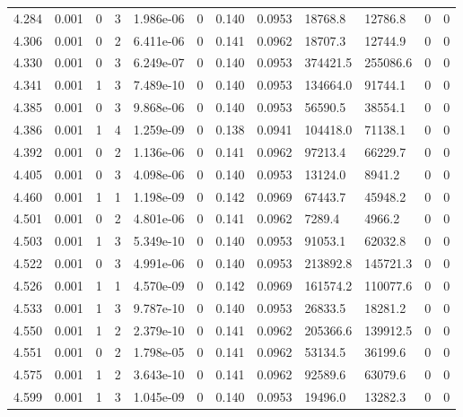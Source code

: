 \documentclass[preview]{standalone}
\begin{document}
{{{{{{\begin{tabular}{L{1.2cm}C{1.2cm} C{0.3cm}C{0.5cm} C{1.4cm}C{1.4cm} C{1.4cm}C{1.4cm} C{1.6cm}C{1.6cm} C{1.6cm}C{1.6cm}}
  4.284  &  0.001  & 0     &  3 &  1.986e-06  & 0  &  0.140&   0.0953& 18768.8 & 12786.8   &  0 & 0  \\ 
  4.306  &  0.001  & 0     &  2 &  6.411e-06  & 0  &  0.141&   0.0962& 18707.3 & 12744.9   &  0 & 0  \\ 
  4.330  &  0.001  & 0     &  3 &  6.249e-07  & 0  &  0.140&   0.0953& 374421.5 & 255086.6   &  0 & 0  \\ 
  4.341  &  0.001  & 1     &  3 &  7.489e-10  & 0  &  0.140&   0.0953& 134664.0 & 91744.1   &  0 & 0  \\ 
  4.385  &  0.001  & 0     &  3 &  9.868e-06  & 0  &  0.140&   0.0953& 56590.5 & 38554.1   &  0 & 0  \\ 
  4.386  &  0.001  & 1     &  4 &  1.259e-09  & 0  &  0.138&   0.0941& 104418.0 & 71138.1   &  0 & 0  \\ 
  4.392  &  0.001  & 0     &  2 &  1.136e-06  & 0  &  0.141&   0.0962& 97213.4 & 66229.7   &  0 & 0  \\ 
  4.405  &  0.001  & 0     &  3 &  4.098e-06  & 0  &  0.140&   0.0953& 13124.0 & 8941.2   &  0 & 0  \\ 
  4.460  &  0.001  & 1     &  1 &  1.198e-09  & 0  &  0.142&   0.0969& 67443.7 & 45948.2   &  0 & 0  \\ 
  4.501  &  0.001  & 0     &  2 &  4.801e-06  & 0  &  0.141&   0.0962& 7289.4 & 4966.2   &  0 & 0  \\ 
  4.503  &  0.001  & 1     &  3 &  5.349e-10  & 0  &  0.140&   0.0953& 91053.1 & 62032.8   &  0 & 0  \\ 
  4.522  &  0.001  & 0     &  3 &  4.991e-06  & 0  &  0.140&   0.0953& 213892.8 & 145721.3   &  0 & 0  \\ 
  4.526  &  0.001  & 1     &  1 &  4.570e-09  & 0  &  0.142&   0.0969& 161574.2 & 110077.6   &  0 & 0  \\ 
  4.533  &  0.001  & 1     &  3 &  9.787e-10  & 0  &  0.140&   0.0953& 26833.5 & 18281.2   &  0 & 0  \\ 
  4.550  &  0.001  & 1     &  2 &  2.379e-10  & 0  &  0.141&   0.0962& 205366.6 & 139912.5   &  0 & 0  \\ 
  4.551  &  0.001  & 0     &  2 &  1.798e-05  & 0  &  0.141&   0.0962& 53134.5 & 36199.6   &  0 & 0  \\ 
  4.575  &  0.001  & 1     &  2 &  3.643e-10  & 0  &  0.141&   0.0962& 92589.6 & 63079.6   &  0 & 0  \\ 
  4.599  &  0.001  & 1     &  3 &  1.045e-09  & 0  &  0.140&   0.0953& 19496.0 & 13282.3   &  0 & 0  \\ 

\end{tabular}}}}}}}
\end{document}
